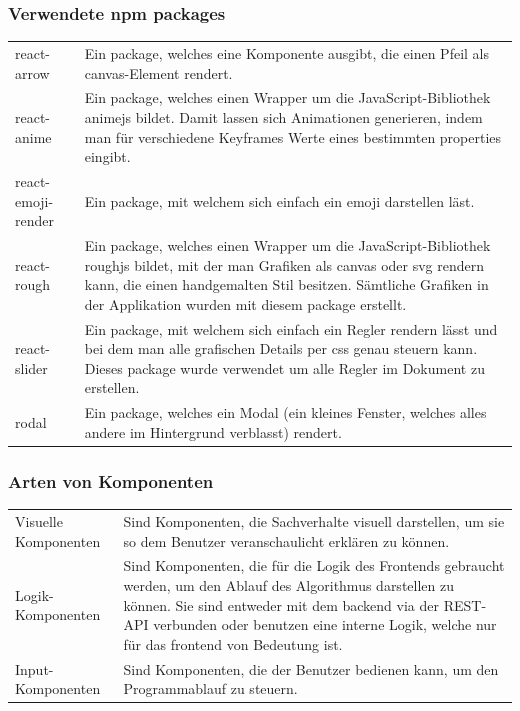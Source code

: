\documentclass[a4paper,10.2pt,pdftex]{scrartcl}%
\begin{document}
\subsubsection{Verwendete npm packages}
\begin{tabularx}{\textwidth}{p{3cm}p{8.5cm}}
react-arrow &  Ein package, welches eine Komponente ausgibt, die einen Pfeil als canvas-Element rendert. \\
react-anime &  Ein package, welches einen Wrapper um die JavaScript-Bibliothek animejs bildet. Damit lassen sich Animationen generieren, indem man für verschiedene Keyframes Werte eines bestimmten properties eingibt. \\
react-emoji-render &  Ein package, mit welchem sich einfach ein emoji darstellen läst. \\
react-rough &  Ein package, welches einen Wrapper um die JavaScript-Bibliothek roughjs bildet, mit der man Grafiken als canvas oder svg rendern kann, die einen handgemalten Stil besitzen. Sämtliche Grafiken in der Applikation wurden mit diesem package erstellt. \\
react-slider&  Ein package, mit welchem sich einfach ein Regler rendern lässt und bei dem man alle grafischen  Details per css genau steuern kann. Dieses package wurde verwendet um alle Regler im Dokument zu erstellen. \\
rodal&  Ein package, welches ein Modal (ein kleines Fenster, welches alles andere im Hintergrund verblasst)  rendert.
\end{tabularx}

\subsubsection{Arten von Komponenten}
\begin{tabularx}{\textwidth}{p{3cm}p{8.5cm}} 
Visuelle Komponenten &  Sind Komponenten, die Sachverhalte visuell darstellen, um sie so dem Benutzer veranschaulicht erklären zu können. \\
Logik-Komponenten & Sind Komponenten, die für die Logik des Frontends gebraucht werden, um den Ablauf des Algorithmus darstellen zu können. Sie sind entweder mit dem backend via der REST-API verbunden oder benutzen eine interne Logik, welche nur für das frontend von Bedeutung ist. \\
Input-Komponenten & Sind Komponenten, die der Benutzer bedienen kann, um den Programmablauf zu steuern.
\end{tabularx}
\end{document}
